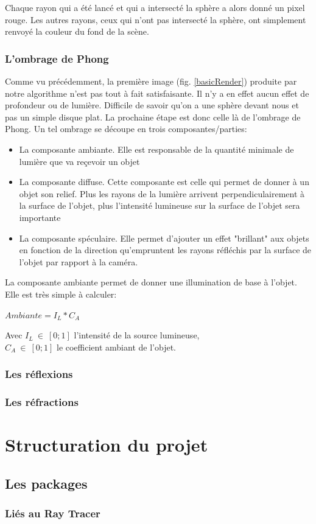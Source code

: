 \documentclass[11pt]{article}
\begin{document}
Chaque rayon qui a été lancé et qui a intersecté la sphère a alors donné un pixel rouge. Les autres rayons, ceux qui n'ont pas intersecté la sphère, ont simplement renvoyé la couleur du fond de la scène. 

\subsubsection{L'ombrage de Phong}

Comme vu précédemment, la première image (fig. \ref{basicRender}) produite par notre algorithme n'est pas tout à fait satisfaisante. Il n'y a en effet aucun effet de profondeur ou de lumière. Difficile de savoir qu'on a une sphère devant nous et pas un simple disque plat. La prochaine étape est donc celle là de l'ombrage de Phong. Un tel ombrage se découpe en trois composantes/parties:
\begin{itemize}
	\item{La composante ambiante. Elle est responsable de la quantité minimale de lumière que va reçevoir un objet}
	\item{La composante diffuse. Cette composante est celle qui permet de donner à un objet son relief. Plus les rayons de la lumière arrivent perpendiculairement à la surface de l'objet, plus l'intensité lumineuse sur la surface de l'objet sera importante}
	\item{La composante spéculaire. Elle permet d'ajouter un effet "brillant" aux objets en fonction de la direction qu'empruntent les rayons réfléchis par la surface de l'objet par rapport à la caméra.}
\end{itemize}

La composante ambiante permet de donner une illumination de base à l'objet. Elle est très simple à calculer:\\

\begin{center}
	$Ambiante = I_L*C_A$
\end{center}
Avec $I_L\ \in\ [0;1]$ l'intensité de la source lumineuse,\\
$C_A\ \in\ [0; 1]$ le coefficient ambiant de l'objet.

\subsubsection{Les réflexions}
\subsubsection{Les réfractions}

\section{Structuration du projet}
\subsection{Les packages}
\subsubsection{Liés au Ray Tracer}
\end{document}
